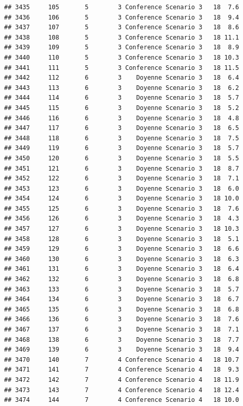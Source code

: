 \documentclass[
]{article}
\begin{document}
\begin{verbatim}
## 3435     105       5        3 Conference Scenario 3   18  7.6
## 3436     106       5        3 Conference Scenario 3   18  9.4
## 3437     107       5        3 Conference Scenario 3   18  8.6
## 3438     108       5        3 Conference Scenario 3   18 11.1
## 3439     109       5        3 Conference Scenario 3   18  8.9
## 3440     110       5        3 Conference Scenario 3   18 10.3
## 3441     111       5        3 Conference Scenario 3   18 11.5
## 3442     112       6        3    Doyenne Scenario 3   18  6.4
## 3443     113       6        3    Doyenne Scenario 3   18  6.2
## 3444     114       6        3    Doyenne Scenario 3   18  5.7
## 3445     115       6        3    Doyenne Scenario 3   18  5.2
## 3446     116       6        3    Doyenne Scenario 3   18  4.8
## 3447     117       6        3    Doyenne Scenario 3   18  6.5
## 3448     118       6        3    Doyenne Scenario 3   18  7.5
## 3449     119       6        3    Doyenne Scenario 3   18  5.7
## 3450     120       6        3    Doyenne Scenario 3   18  5.5
## 3451     121       6        3    Doyenne Scenario 3   18  8.7
## 3452     122       6        3    Doyenne Scenario 3   18  7.1
## 3453     123       6        3    Doyenne Scenario 3   18  6.0
## 3454     124       6        3    Doyenne Scenario 3   18 10.0
## 3455     125       6        3    Doyenne Scenario 3   18  7.6
## 3456     126       6        3    Doyenne Scenario 3   18  4.3
## 3457     127       6        3    Doyenne Scenario 3   18 10.3
## 3458     128       6        3    Doyenne Scenario 3   18  5.1
## 3459     129       6        3    Doyenne Scenario 3   18  6.6
## 3460     130       6        3    Doyenne Scenario 3   18  6.3
## 3461     131       6        3    Doyenne Scenario 3   18  6.4
## 3462     132       6        3    Doyenne Scenario 3   18  6.8
## 3463     133       6        3    Doyenne Scenario 3   18  5.7
## 3464     134       6        3    Doyenne Scenario 3   18  6.7
## 3465     135       6        3    Doyenne Scenario 3   18  6.8
## 3466     136       6        3    Doyenne Scenario 3   18  7.6
## 3467     137       6        3    Doyenne Scenario 3   18  7.1
## 3468     138       6        3    Doyenne Scenario 3   18  7.7
## 3469     139       6        3    Doyenne Scenario 3   18  9.4
## 3470     140       7        4 Conference Scenario 4   18 10.7
## 3471     141       7        4 Conference Scenario 4   18  9.3
## 3472     142       7        4 Conference Scenario 4   18 11.9
## 3473     143       7        4 Conference Scenario 4   18 12.4
## 3474     144       7        4 Conference Scenario 4   18 10.0

\end{verbatim}
\end{document}
